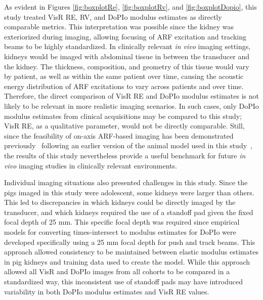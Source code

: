 As evident in Figures \ref{fig:boxplotRe}, \ref{fig:boxplotRv}, and \ref{fig:boxplotDopio}, this study treated VisR RE, RV, and DoPIo modulus estimates as directly comparable metrics. This interpretation was possible since the kidney was exteriorized during imaging, allowing focusing of ARF excitation and tracking beams to be highly standardized. In clinically relevant \emph{in vivo} imaging settings, kidneys would be imaged with abdominal tissue in between the transducer and the kidney. The thickness, composition, and geometry of this tissue would vary by patient, as well as within the same patient over time, causing the acoustic energy distribution of ARF excitations to vary across patients and over time. Therefore, the direct comparison of VisR RE and DoPIo modulus estimates is not likely to be relevant in more realistic imaging scenarios. In such cases, only DoPIo modulus estimates from clinical acquisitions may be compared to this study; VisR RE, as a qualitative parameter, would not be directly comparable. Still, since the feasibility of on-axis ARF-based imaging has been demonstrated previously~\cite{hossain_Evaluating_2018} following an earlier version of the animal model used in this study~\cite{hossain_Mechanical_2019}, the results of this study nevertheless provide a useful benchmark for future \emph{in vivo} imaging studies in clinically relevant environments.

Individual imaging situations also presented challenges in this study. Since the pigs imaged in this study were adolescent, some kidneys were larger than others. This led to discrepancies in which kidneys could be directly imaged by the transducer, and which kidneys required the use of a standoff pad given the fixed focal depth of 25 mm. This specific focal depth was required since empirical models for converting times-intersect to modulus estimates for DoPIo were developed specifically using a 25 mm focal depth for push and track beams. This approach allowed consistency to be maintained between elastic modulus estimates in pig kidneys and training data used to create the model. While this approach allowed all VisR and DoPIo images from all cohorts to be compared in a standardized way, this inconsistent use of standoff pads may have introduced variability in both DoPIo modulus estimates and VisR RE values.

